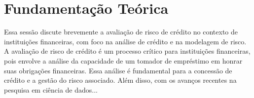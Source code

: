 \chapter{Fundamentação Teórica}
\label{cap:fundamentacaoTeorica}

Essa sessão discute brevemente a avaliação de risco de crédito no contexto de
instituições financeiras, com foco na análise de crédito e na modelagem de risco.
A avaliação de risco de crédito é um processo crítico para instituições
financeiras, pois envolve a análise da capacidade de um tomador de empréstimo em
honrar suas obrigações financeiras. Essa análise é fundamental para a concessão
de crédito e a gestão do risco associado. Além disso, com os avanços recentes na
pesquisa em ciência de dados...


